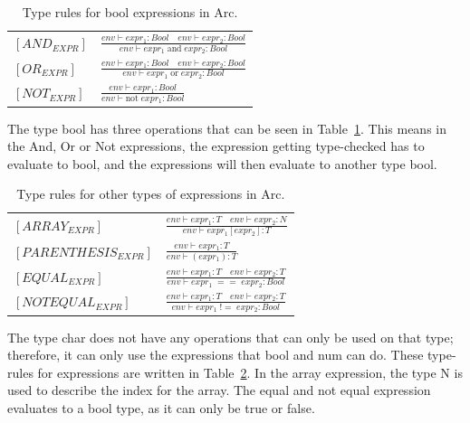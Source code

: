 \begin{table}[htb!]
    \centering
    \begin{tabular}{ll}
        \toprule
        $[AND_{EXPR}] $ & $\frac
            {env\vdash expr_1: Bool \quad env\vdash expr_2: Bool}
            {env\vdash expr_1 \;\text{and} \;expr_2: Bool}$
        \\ [12pt]
        $[OR_{EXPR}] $  & $\frac
            {env\vdash expr_1: Bool \quad env\vdash expr_2: Bool}
            {env\vdash expr_1 \;\text{or} \;expr_2: Bool}$
        \\ [12pt]
        $[NOT_{EXPR}] $ & $\frac
            {env\vdash expr_1: Bool}
            {env\vdash \text{not} \; expr_1 : Bool}$
        \\
        \bottomrule
    \end{tabular}
    \caption{Type rules for bool expressions in Arc.}
    \label{tab:bool-rules}
\end{table}


The type bool has three operations that can be seen in Table~\ref{tab:bool-rules}. This means in the And, Or or Not expressions, the expression getting type-checked has to evaluate to bool, and the expressions will then evaluate to another type bool.


\begin{table}[htb!]
    \centering
    \begin{tabular}{ll}
        \toprule
        $[ARRAY_{EXPR}]$      & $ \frac
            {env\vdash expr_1: T \quad env \vdash expr_2 : N}
            {env\vdash expr_1[expr_2] : T}$
        \\ [12pt]
        $[PARENTHESIS_{EXPR}]$ & $ \frac
            {env\vdash expr_1: T}
            {env\vdash (expr_1) : T}$
        \\ [12pt]
        $[EQUAL_{EXPR}] $     & $\frac
            {env\vdash expr_1: T \quad env\vdash expr_2: T}
            {env\vdash expr_1 \;== \;expr_2: Bool}$
        \\ [12pt]
        $[NOTEQUAL_{EXPR}] $  & $\frac
            {env\vdash expr_1: T \quad env\vdash expr_2: T}
            {env\vdash expr_1 \;!= \;expr_2: Bool}$
        \\
        \bottomrule
    \end{tabular}
    \caption{Type rules for other types of expressions in Arc.}
    \label{tab:expr-rules}
\end{table}

The type char does not have any operations that can only be used on that type; therefore, it can only use the expressions that bool and num can do. These type-rules for expressions are written in Table~\ref{tab:expr-rules}. In the array expression, the type N is used to describe the index for the array. The equal and not equal expression evaluates to a bool type, as it can only be true or false.


